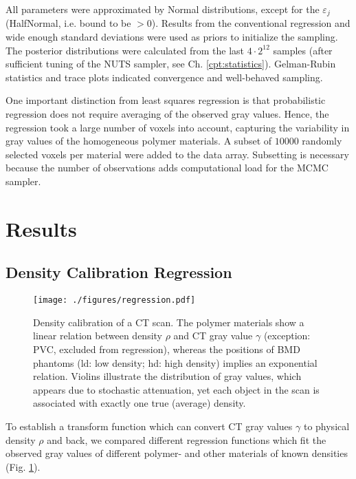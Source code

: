 All parameters were approximated by Normal distributions, except for the \(\varepsilon_{j}\) (HalfNormal, i.e. bound to be \(>0\)).
Results from the conventional regression and wide enough standard deviations were used as priors to initialize the sampling.
The posterior distributions were calculated from the last \(4\cdot 2^{12}\) samples (after sufficient tuning of the NUTS sampler, see Ch. \ref{cpt:statistics}).
Gelman-Rubin statistics and trace plots indicated convergence and well-behaved sampling.


One important distinction from least squares regression is that probabilistic regression does not require averaging of the observed gray values.
Hence, the regression took a large number of voxels into account, capturing the variability in gray values of the homogeneous polymer materials.
A subset of \(10000\) randomly selected voxels per material were added to the data array.
Subsetting is necessary because the number of observations adds computational load for the MCMC sampler.


\clearpage
\section{Results}
\label{sec:orgd09b826}
\subsection{Density Calibration Regression}
\label{sec:org3d4354c}
\begin{figure}[p]
\centering
\texttt{[image: ./figures/regression.pdf]}
\caption{\label{fig:density_calibration}Density calibration of a CT scan. The polymer materials show a linear relation between density \(\rho\) and CT gray value \(\gamma\) (exception: PVC, excluded from regression), whereas the positions of BMD phantoms (ld: low density; hd: high density) implies an exponential relation. Violins illustrate the distribution of gray values, which appears due to stochastic attenuation, yet each object in the scan is associated with exactly one true (average) density.}
\end{figure}

To establish a transform function which can convert CT gray values \(\gamma\) to physical density \(\rho\) and back, we compared different regression functions which fit the observed gray values of different polymer- and other materials of known densities (Fig. \ref{fig:density_calibration}).

